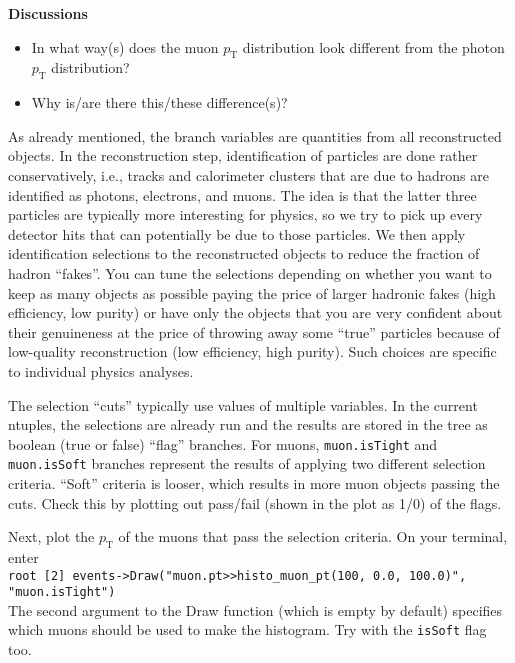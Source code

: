 \documentclass[12pt]{article}
\newcommand{\rterminal}[2]{\vspace{3pt}\texttt{root [#1] #2} \\}
\newcommand{\pt}{\ensuremath{p_{\mathrm{T}}}\xspace}
\newenvironment{discussions}{%
\vspace{0.2in}%
\textbf{Discussions}%
\begin{itemize}%
}{%
\end{itemize}%
}
\begin{document}
\begin{discussions}
\item In what way(s) does the muon \pt distribution look different from the photon \pt distribution?
\item Why is/are there this/these difference(s)?
\end{discussions}

As already mentioned, the branch variables are quantities from all reconstructed objects. In the reconstruction step, identification of particles are done rather conservatively, i.e., tracks and calorimeter clusters that are due to hadrons are identified as photons, electrons, and muons. The idea is that the latter three particles are typically more interesting for physics, so we try to pick up every detector hits that can potentially be due to those particles. We then apply identification selections to the reconstructed objects to reduce the fraction of hadron ``fakes''. You can tune the selections depending on whether you want to keep as many objects as possible paying the price of larger hadronic fakes (high efficiency, low purity) or have only the objects that you are very confident about their genuineness at the price of throwing away some ``true'' particles because of low-quality reconstruction (low efficiency, high purity). Such choices are specific to individual physics analyses.

The selection ``cuts'' typically use values of multiple variables. In the current ntuples, the selections are already run and the results are stored in the tree as boolean (true or false) ``flag'' branches. For muons, \texttt{muon.isTight} and \texttt{muon.isSoft} branches represent the results of applying two different selection criteria. ``Soft'' criteria is looser, which results in more muon objects passing the cuts. Check this by plotting out pass/fail (shown in the plot as 1/0) of the flags.

Next, plot the \pt of the muons that pass the selection criteria. On your terminal, enter \\
\rterminal{2}{events->Draw("muon.pt>>histo\_muon\_pt(100, 0.0, 100.0)", "muon.isTight")}
The second argument to the Draw function (which is empty by default) specifies which muons should be used to make the histogram. Try with the \texttt{isSoft} flag too.
\end{document}
